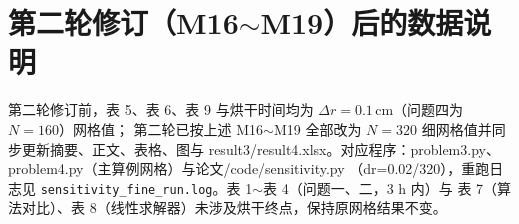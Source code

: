 \documentclass[UTF8,zihao=-4]{ctexart}
\begin{document}
\section{第二轮修订（M16$\sim$M19）后的数据说明}

第二轮修订前，表 5、表 6、表 9 与烘干时间均为 $\Delta r=0.1\,\mathrm{cm}$（问题四为 $N=160$）网格值；
第二轮已按上述 M16$\sim$M19 全部改为 $N=320$ 细网格值并同步更新摘要、正文、表格、图与
result3/result4.xlsx。对应程序：problem3.py、problem4.py（主算例网格）与论文/code/sensitivity.py
（dr=0.02/320），重跑日志见 \texttt{sensitivity\_fine\_run.log}。表 1$\sim$表 4（问题一、二，3 h 内）与
表 7（算法对比）、表 8（线性求解器）未涉及烘干终点，保持原网格结果不变。
\end{document}
